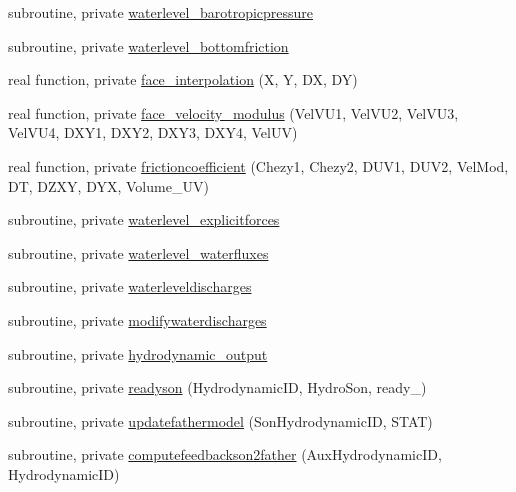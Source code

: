 \begin{DoxyCompactItemize}
\item 
subroutine, private \mbox{\hyperlink{namespacemodulehydrodynamic_a5e6cdcb5121c8a2db4d545b07bfd4d73}{waterlevel\+\_\+barotropicpressure}}
\item 
subroutine, private \mbox{\hyperlink{namespacemodulehydrodynamic_ae585f218a774bfbfdd6f830f47de4d2a}{waterlevel\+\_\+bottomfriction}}
\item 
real function, private \mbox{\hyperlink{namespacemodulehydrodynamic_aeaeab24d9e7539d66950b61105ead64f}{face\+\_\+interpolation}} (X, Y, DX, DY)
\item 
real function, private \mbox{\hyperlink{namespacemodulehydrodynamic_a59e16bb385ccdef967139d17eb850973}{face\+\_\+velocity\+\_\+modulus}} (Vel\+V\+U1, Vel\+V\+U2, Vel\+V\+U3, Vel\+V\+U4, D\+X\+Y1, D\+X\+Y2, D\+X\+Y3, D\+X\+Y4, Vel\+UV)
\item 
real function, private \mbox{\hyperlink{namespacemodulehydrodynamic_aa1565fcf41a2baafe5216a3a1a3a963f}{frictioncoefficient}} (Chezy1, Chezy2, D\+U\+V1, D\+U\+V2, Vel\+Mod, DT, D\+Z\+XY, D\+YX, Volume\+\_\+\+UV)
\item 
subroutine, private \mbox{\hyperlink{namespacemodulehydrodynamic_a8f55c0f844c6c92f25d99d0c16b764df}{waterlevel\+\_\+explicitforces}}
\item 
subroutine, private \mbox{\hyperlink{namespacemodulehydrodynamic_a592aa79c419a6f5815c5df5a4b4548a9}{waterlevel\+\_\+waterfluxes}}
\item 
subroutine, private \mbox{\hyperlink{namespacemodulehydrodynamic_a644daa49a5aa05490db0fd5dae3af00c}{waterleveldischarges}}
\item 
subroutine, private \mbox{\hyperlink{namespacemodulehydrodynamic_a3efd394333f3dd01635ae28bbea6dd28}{modifywaterdischarges}}
\item 
subroutine, private \mbox{\hyperlink{namespacemodulehydrodynamic_a60b8585327586b632ce2934f2676df87}{hydrodynamic\+\_\+output}}
\item 
subroutine, private \mbox{\hyperlink{namespacemodulehydrodynamic_a89980d9805db3770c7583bdefe7730fa}{readyson}} (Hydrodynamic\+ID, Hydro\+Son, ready\+\_\+)
\item 
subroutine, private \mbox{\hyperlink{namespacemodulehydrodynamic_a18824f0ade9c1b8a9140a405a5a343db}{updatefathermodel}} (Son\+Hydrodynamic\+ID, S\+T\+AT)
\item 
subroutine, private \mbox{\hyperlink{namespacemodulehydrodynamic_a83eb2d1806304e7bfac59fbf155291e4}{computefeedbackson2father}} (Aux\+Hydrodynamic\+ID, Hydrodynamic\+ID)
\item 

\end{DoxyCompactItemize}
